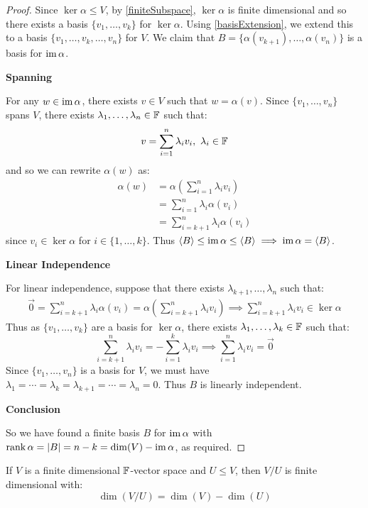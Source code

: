 \documentclass[../main.tex]{subfiles}
\begin{document}
\begin{proof}
  Since $\ker \alpha \leq V$, by \cref{finiteSubspace}, $\ker \alpha$ is finite dimensional and so there exists a basis $\{v_1, \ldots, v_k\}$ for $\ker \alpha$.
  Using \cref{basisExtension}, we extend this to a basis $\{v_1, \ldots, v_k, \ldots, v_n\}$ for $V$.
  We claim that $B = \{\alpha(v_{k + 1}), \ldots, \alpha(v_n)\}$ is a basis for $\operatorname{im} \alpha$.

  \textbf{Spanning}\par
  For any $w \in \operatorname{im} \alpha$, there exists $v \in V$ such that $w = \alpha(v)$.
  Since $\{v_1, \ldots, v_n\}$ spans $V$, there exists $\lambda_1, \ldots, \lambda_n \in \mathbb{F}$ such that:
  \[
    v = \sum_{i = 1}^{n} \lambda_i v_i,\ \lambda_i \in \mathbb{F}
  \]
  and so we can rewrite $\alpha(w)$ as:
  \begin{align*}
    \alpha(w) &= \alpha\left(\sum_{i = 1}^{n} \lambda_i v_i\right) \\
              &= \sum_{i = 1}^{n} \lambda_i \alpha(v_i) \\
              &= \sum_{i = k + 1}^{n} \lambda_i \alpha(v_i)
  \end{align*}
  since $v_i \in \ker \alpha$ for $i \in \{1, \ldots, k\}$.
  Thus $\langle B \rangle \leq \operatorname{im} \alpha \leq \langle B \rangle \implies \operatorname{im} \alpha = \langle B \rangle$.

  \textbf{Linear Independence}\par
  For linear independence, suppose that there exists $\lambda_{k + 1}, \ldots, \lambda_n$ such that:
  \begin{align*}
    \vec{0} = \sum_{i = k + 1}^{n} \lambda_i \alpha(v_i) = \alpha\left(\sum_{i = k +1}^{n} \lambda_i v_i\right) \implies \sum_{i = k + 1}^{n} \lambda_i v_i \in \ker \alpha
  \end{align*}
  Thus as $\{v_1, \ldots, v_k\}$ are a basis for $\ker \alpha$, there exists $\lambda_1, \ldots, \lambda_k \in \mathbb{F}$ such that:
  \[
    \sum_{i = k + 1}^{n} \lambda_i v_i = - \sum_{i = 1}^{k} \lambda_i v_i \implies \sum_{i = 1}^{n} \lambda_i v_i = \vec{0}
  \]
  Since $\{v_1, \ldots, v_n\}$ is a basis for $V$, we must have $\lambda_1 = \cdots = \lambda_k = \lambda_{k + 1} = \cdots = \lambda_n = 0$.
  Thus $B$ is linearly independent.

  \textbf{Conclusion}\par
  So we have found a finite basis $B$ for $\operatorname{im} \alpha$ with $\operatorname{rank} \alpha = |B| = n - k = \dim(V) - \operatorname{im} \alpha$, as required.
\end{proof}
\begin{corollary}
  If $V$ is a finite dimensional $\mathbb{F}$-vector space and $U \leq V$, then $V / U$ is finite dimensional with: \label{quotDim}
  \[
    \dim(V / U) = \dim(V) - \dim(U)
  \]
\end{corollary}
\end{document}
